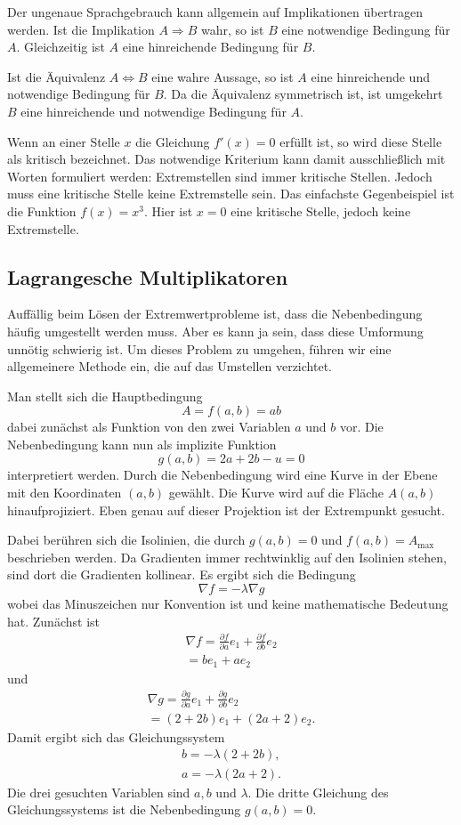 \documentclass[a4paper,11pt,fleqn,twocolumn]{article}
\begin{document}
Der ungenaue Sprachgebrauch kann allgemein auf Implikationen
übertragen werden. Ist die Implikation
\(A\Rightarrow B\)
wahr, so ist \(B\) eine notwendige Bedingung für \(A\).
Gleichzeitig ist \(A\) eine hinreichende Bedingung für \(B\).

Ist die Äquivalenz \(A\Leftrightarrow B\) eine wahre Aussage, so ist
\(A\) eine hinreichende und notwendige Bedingung für \(B\). Da die
Äquivalenz symmetrisch ist, ist umgekehrt \(B\) eine hinreichende
und notwendige Bedingung für \(A\).

Wenn an einer Stelle \(x\) die Gleichung \(f'(x)=0\) erfüllt ist,
so wird diese Stelle als kritisch bezeichnet. Das notwendige
Kriterium kann damit ausschließlich mit Worten formuliert werden:
Extremstellen sind immer kritische Stellen. Jedoch muss eine kritische
Stelle keine Extremstelle sein. Das einfachste Gegenbeispiel ist
die Funktion \(f(x)=x^3\). Hier ist \(x=0\) eine kritische Stelle,
jedoch keine Extremstelle.

\subsection*{Lagrangesche Multiplikatoren}

Auffällig beim Lösen der Extremwertprobleme ist, dass die
Nebenbedingung häufig umgestellt werden muss. Aber es kann ja sein,
dass diese Umformung unnötig schwierig ist. Um dieses Problem zu
umgehen, führen wir eine allgemeinere Methode ein, die auf das
Umstellen verzichtet.

Man stellt sich die
Hauptbedingung
\[A=f(a,b)=ab\]
dabei zunächst als Funktion von den zwei
Variablen \(a\) und \(b\) vor. Die Nebenbedingung kann nun als
implizite Funktion
\[g(a,b)=2a+2b-u=0\]
interpretiert werden. Durch die
Nebenbedingung wird eine Kurve in der Ebene mit den Koordinaten
\((a,b)\) gewählt. Die Kurve wird auf die Fläche \(A(a,b)\)
hinaufprojiziert. Eben genau auf dieser Projektion ist der
Extrempunkt gesucht.

Dabei berühren sich die Isolinien, die durch \(g(a,b)=0\) und
\(f(a,b)=A_\mathrm{max}\) beschrieben werden. Da Gradienten immer
rechtwinklig auf den Isolinien stehen, sind dort die Gradienten
kollinear. Es ergibt sich die Bedingung
\[\nabla f = -\lambda\nabla g\]
wobei das Minuszeichen nur Konvention ist und keine mathematische
Bedeutung hat. Zunächst ist
\begin{gather*}
\nabla f = \frac{\partial f}{\partial a}e_1
+\frac{\partial f}{\partial b}e_2\\
= be_1+ae_2
\end{gather*}
und
\begin{gather*}
\nabla g = \frac{\partial g}{\partial a}e_1
+\frac{\partial g}{\partial b}e_2\\
= (2+2b)e_1+(2a+2)e_2.
\end{gather*}
Damit ergibt sich das Gleichungssystem
\begin{gather*}
b=-\lambda (2+2b),\\
a=-\lambda (2a+2).
\end{gather*}
Die drei gesuchten Variablen sind \(a,b\) und \(\lambda\).
Die dritte Gleichung des Gleichungssystems ist die Nebenbedingung
\(g(a,b)=0\).
\end{document}
